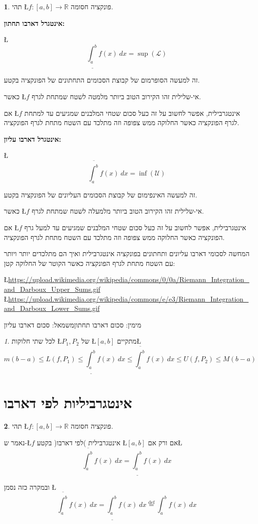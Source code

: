 \documentclass[english,hebrew]{article}
\theoremstyle{remark}
\theoremstyle{definition}
\newtheorem*{defn*}{\protect\definitionname}
\theoremstyle{plain}
\theoremstyle{remark}
\newtheorem{claim}[thm]{\protect\claimname}
\theoremstyle{plain}
\theoremstyle{plain}
\providecommand{\claimname}{טענה}
\providecommand{\definitionname}{הגדרה}
\begin{document}
\begin{defn*}
תהי \L{$f:\left[a,b\right]\rightarrow\mathbb{R}$} פונקציה חסומה.

\textbf{אינטגרל דארבו תחתון:}

\L{%
\[
\underline{\int_{a}^{b}}f(x)\ dx=\sup\left(\mathcal{L}\right)
\]
}%

זה למעשה הסופרמום של קבוצת הסכומים התחתונים של הפונקציה בקטע.

כאשר \L{$f$} אי-שלילית זהו הקירוב הטוב ביותר מלמטה לשטח שמתחת לגרף.

אם \L{$f$} אינטגרבילית, אפשר לחשוב על זה כעל סכום שטחי המלבנים שמגיעים
עד למתחת לגרף הפונקציה כאשר החלוקה ממש צפופה וזה מתלכד עם השטח מתחת
לגרף הפונקציה.

\textbf{אינטגרל דארבו עליון:}

\L{%
\[
\overline{\int_{a}^{b}}f(x)\ dx=\inf\left(\mathcal{U}\right)
\]
}%

זה למעשה האינפימום של קבוצת הסכומים העליונים של הפונקציה בקטע.

כאשר \L{$f$} אי-שלילית זהו הקירוב הטוב ביותר מלמעלה לשטח שמתחת לגרף.

אם \L{$f$} אינטגרבילית, אפשר לחשוב על זה כעל סכום שטחי המלבנים שמגיעים
עד למעל גרף הפונקציה כאשר החלוקה ממש צפופה וזה מתלכד עם השטח מתחת
לגרף הפונקציה.
\end{defn*}
המחשה לסכומי דארבו עליונים ותחתונים בפונקציה אינטגרבילית ואיך הם מתלכדים
יותר ויותר עם השטח מתחת לגרף הפונקציה כאשר הקוטר של החלוקה קטן:
\begin{center}
\L{\url{https://upload.wikimedia.org/wikipedia/commons/0/0a/Riemann_Integration_and_Darboux_Upper_Sums.gif}}
\L{\url{https://upload.wikimedia.org/wikipedia/commons/e/e3/Riemann_Integration_and_Darboux_Lower_Sums.gif}}
\par\end{center}

מימין: סכום דארבו תחתון\qquad{}משמאל: סכום דארבו עליון
\begin{claim}
לכל שתי חלוקות \L{$P_{1},P_{2}$} של \L{$\left[a,b\right]$} מתקיים\L{%
\[
m\left(b-a\right)\le L\left(f,P_{1}\right)\le\underline{\int_{a}^{b}}f(x)\ dx\le\overline{\int_{a}^{b}}f(x)\ dx\le U\left(f,P_{2}\right)\le M\left(b-a\right)
\]
}%
\end{claim}

\section{אינטגרביליות לפי דארבו}
\begin{defn*}
תהי \L{$f:\left[a,b\right]\rightarrow\mathbb{R}$} פונקציה חסומה.

נאמר ש-\L{$f$} אינטגרבילית )לפי דארבו( בקטע \L{$\left[a,b\right]$}
אם ורק אם\L{%
\[
\overline{\int_{a}^{b}}f(x)\ dx=\underline{\int_{a}^{b}}f(x)\ dx
\]
}%

ובמקרה כזה נסמן \L{%
\[
\overline{\int_{a}^{b}}f(x)\ dx=\underline{\int_{a}^{b}}f(x)\ dx\overset{\text{def}}{=}\int_{a}^{b}f(x)\ dx
\]
}%
\end{defn*}
\end{document}
